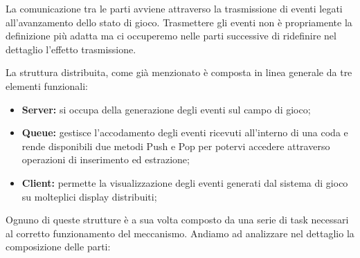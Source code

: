 \documentclass[aps,letterpaper,10pt]{article}
\begin{document}
La comunicazione tra le parti avviene attraverso la trasmissione di eventi legati all'avanzamento dello stato di gioco. Trasmettere gli eventi non \`e propriamente la definizione pi\`u adatta ma ci occuperemo nelle parti successive di ridefinire nel dettaglio l'effetto trasmissione. \vspace{3mm}

La struttura distribuita, come gi\`a menzionato \`e composta in linea generale da tre elementi funzionali:

\begin{itemize}
	\item \textbf{Server:} si occupa della generazione degli eventi sul campo di gioco;
	\item \textbf{Queue:} gestisce l'accodamento degli eventi ricevuti all'interno di una coda e rende disponibili due metodi Push e Pop per potervi accedere attraverso operazioni di inserimento ed estrazione;
	\item \textbf{Client:} permette la visualizzazione degli eventi generati dal sistema di gioco su molteplici display distribuiti;
\end{itemize}

Ognuno di queste strutture \`e a sua volta composto da una serie di task necessari al corretto funzionamento del meccanismo. Andiamo ad analizzare nel dettaglio la composizione delle parti:
\end{document}
